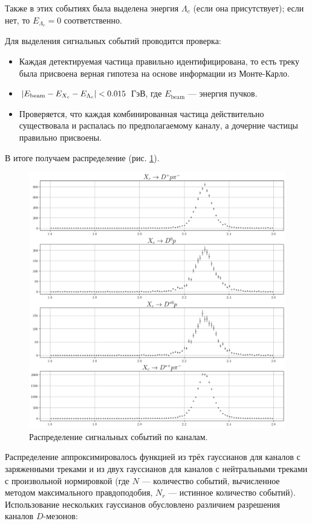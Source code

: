 Также в этих событиях была выделена энергия $\Lambda_c$ (если она присутствует); если нет, то $E_{\Lambda_c} = 0$ соответственно.

Для выделения сигнальных событий проводится проверка:

\begin{itemize}
    \item Каждая детектируемая частица правильно идентифицирована, то есть треку была присвоена верная гипотеза на основе информации из Монте-Карло.
    \item $\abs{E_{\text{beam}} - E_{X_c} - E_{\Lambda_c}} < 0.015$ ГэВ, где $E_{\text{beam}}$ — энергия пучков.
    \item Проверяется, что каждая комбинированная частица действительно существовала и распалась по предполагаемому каналу, а дочерние частицы правильно присвоены.
\end{itemize}

В итоге получаем распределение (рис. \ref{MC_sig}).

\begin{figure}[H]
    \centering
    \includegraphics[width=1\linewidth]{img/MC_sig.png}
    \caption{Распределение сигнальных событий по каналам.}
    \label{MC_sig}
\end{figure}

Распределение аппроксимировалось функцией из трёх гауссианов для каналов с заряженными треками и из двух гауссианов для каналов с нейтральными треками с произвольной нормировкой (где $N$ — количество событий, вычисленное методом максимального правдоподобия, $N_r$ — истинное количество событий). Использование нескольких гауссианов обусловлено различием разрешения каналов $D$-мезонов:

